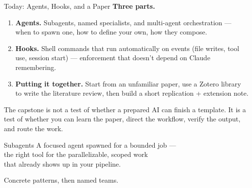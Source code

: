 \documentclass[aspectratio=169, 11pt]{beamer}
\begin{document}
\begin{frame}{Today: Agents, Hooks, and a Paper}
  \textbf{Three parts.}

  \vspace{0.7em}
  \begin{enumerate}
    \item \textbf{Agents.} Subagents, named specialists, and multi-agent orchestration --- when to spawn one, how to define your own, how they compose.

    \vspace{0.5em}
    \item \textbf{Hooks.} Shell commands that run automatically on events (file writes, tool use, session start) --- enforcement that doesn't depend on Claude remembering.

    \vspace{0.5em}
    \item \textbf{Putting it together.} Start from an unfamiliar paper, use a Zotero library to write the literature review, then build a short replication + extension note.
  \end{enumerate}

  \vspace{0.8em}
  \alert{The capstone is not a test of whether a prepared AI can finish a template. It is a test of whether you can learn the paper, direct the workflow, verify the output, and route the work.}
\end{frame}


\begin{frame}{Subagents}
  \centering
  \vspace{2em}
  {\Large A focused agent spawned for a bounded job ---\\[0.3em]
  the right tool for the parallelizable, scoped work\\[0.3em]
  that already shows up in your pipeline.}

  \vspace{2em}
  Concrete patterns, then named teams.
\end{frame}
\end{document}
